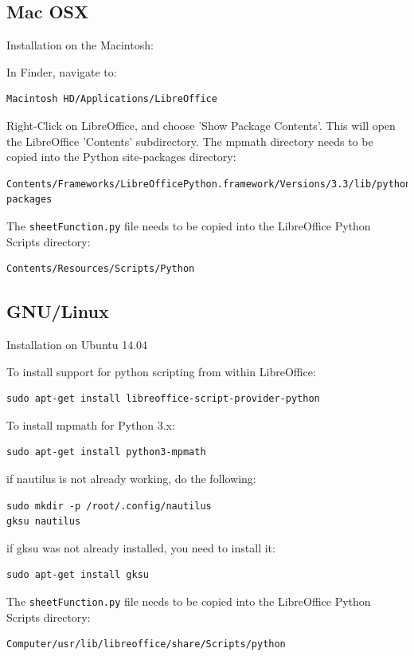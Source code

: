 \subsection{Mac OSX}
Installation on the Macintosh:

In Finder, navigate to:
\begin{verbatim}
Macintosh HD/Applications/LibreOffice
\end{verbatim}	
Right-Click on LibreOffice, and choose 'Show Package Contents'. This will open the LibreOffice  'Contents' subdirectory.
The mpmath directory needs to be copied into the Python site-packages directory:
\begin{verbatim}
Contents/Frameworks/LibreOfficePython.framework/Versions/3.3/lib/python3.3/site-packages
\end{verbatim}
The \verb|sheetFunction.py| file needs to be copied into the  LibreOffice Python Scripts directory:
\begin{verbatim}
Contents/Resources/Scripts/Python
\end{verbatim}


\subsection{GNU/Linux}
Installation on Ubuntu 14.04

To install support for python scripting from within LibreOffice:
\begin{verbatim}
sudo apt-get install libreoffice-script-provider-python
\end{verbatim}

To install mpmath for Python 3.x:
\begin{verbatim}
sudo apt-get install python3-mpmath
\end{verbatim}

if nautilus is not already working, do the following:
\begin{verbatim}
sudo mkdir -p /root/.config/nautilus
gksu nautilus
\end{verbatim}

if gksu was not already installed, you need to install it:
\begin{verbatim}
sudo apt-get install gksu
\end{verbatim}

The \verb|sheetFunction.py| file needs to be copied into the LibreOffice Python Scripts directory:
\begin{verbatim}
Computer/usr/lib/libreoffice/share/Scripts/python
\end{verbatim}



